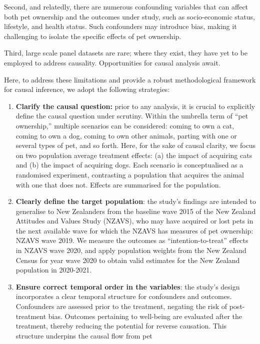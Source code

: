 \documentclass[
  singlecolumn,
  9pt]{article}
\begin{document}
Second, and relatedly, there are numerous confounding variables that can
affect both pet ownership and the outcomes under study, such as
socio-economic status, lifestyle, and health status. Such confounders
may introduce bias, making it challenging to isolate the specific
effects of pet ownership.

Third, large scale panel datasets are rare; where they exist, they have
yet to be employed to address causality. Opportunities for causal
analysis await.

Here, to address these limitations and provide a robust methodological
framework for causal inference, we adopt the following strategies:

\begin{enumerate}
\def\labelenumi{\arabic{enumi}.}
\item
  \textbf{Clarify the causal question:} prior to any analysis, it is
  crucial to explicitly define the causal question under scrutiny.
  Within the umbrella term of ``pet ownership,'' multiple scenarios can
  be considered: coming to own a cat, coming to own a dog, coming to own
  other animals, parting with one or several types of pet, and so forth.
  Here, for the sake of causal clarity, we focus on two population
  average treatment effects: (a) the impact of acquiring cats and (b)
  the impact of acquiring dogs. Each scenario is conceptualised as a
  randomised experiment, contrasting a population that acquires the
  animal with one that does not. Effects are summarised for the
  population.
\item
  \textbf{Clearly define the target population}: the study's findings
  are intended to generalise to New Zealanders from the baseline wave
  2015 of the New Zealand Attitudes and Values Study (NZAVS), who may
  have acquired or lost pets in the next available wave for which the
  NZAVS has measures of pet ownership: NZAVS wave 2019. We measure the
  outcomes as ``intention-to-treat'' effects in NZAVS wave 2020, and
  apply population weights from the New Zealand Census for year wave
  2020 to obtain valid estimates for the New Zealand population in
  2020-2021.
\item
  \textbf{Ensure correct temporal order in the variables}: the study's
  design incorporates a clear temporal structure for confounders and
  outcomes. Confounders are assessed prior to the treatment, negating
  the risk of post-treatment bias. Outcomes pertaining to well-being are
  evaluated after the treatment, thereby reducing the potential for
  reverse causation. This structure underpins the causal flow from pet

\end{enumerate}
\end{document}
